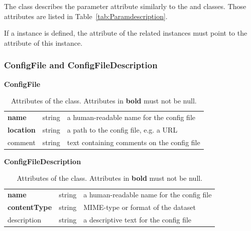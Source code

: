 The  class describes the parameter  attribute similarly to the  and  classes. Those attributes are listed in Table~\ref{tab:Paramdescription}.

If a  instance is defined, the  attribute of the related  instances must point to the  attribute of this  instance.


\subsubsection{ConfigFile and ConfigFileDescription }

\begin{table}[ht]
\small
{}\textwidth
 \textbf{\normalsize ConfigFile}\vspace{0.25em}\\
 \begin{tabulary}{1.0\textwidth}{llL}
 \toprule
  &    & \\
 \midrule
\textbf{name} &  string & a human-readable name for the config file \\
\textbf{location} & string  &  a path to the config file, e.g. a URL \\
comment & string  & text containing comments on the config file  \\
\bottomrule
\end{tabulary}
\caption[Attributes of the  class]{Attributes of the  class. Attributes in \textbf{bold} must not be null.}
\label{tab:configfile}
\end{table}

\begin{table}[ht]
\small
{}\textwidth
\textbf{\normalsize ConfigFileDescription}\vspace{0.25em}\\
\begin{tabulary}{1.0\textwidth}{llL}
 \toprule
  &    & \\
 \midrule
\textbf{name}    & string & a human-readable name for the config file \\
\textbf{contentType}  & string  & MIME-type or format of the dataset \\
description     & string  & a descriptive text for the config file \\
\bottomrule
\end{tabulary}
\caption[Attributes of the  class]{Attributes of the   class. Attributes in \textbf{bold} must not be null.}
\label{tab:configfiledescription}
\end{table}


